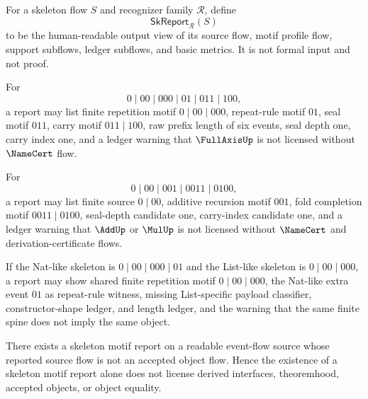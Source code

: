 \begin{definition}
\label{def:case-studies-skeleton-report}
For a skeleton flow $S$ and recognizer family $\mathcal R$, define
$$
  \mathsf{SkReport}_{\mathcal R}(S)
$$
to be the human-readable output view of its source flow, motif profile flow, support subflows, ledger subflows, and basic metrics. It is not formal input and not proof.
\end{definition}

\begin{example}
\label{ex:case-studies-completion-report}
For
$$
  0\mid 00\mid 000\mid 01\mid 011\mid 100,
$$
a report may list finite repetition motif $0\mid 00\mid 000$, repeat-rule motif $01$, seal motif $011$, carry motif $011\mid 100$, raw prefix length of six events, seal depth one, carry index one, and a ledger warning that $\FullAxisUp$ is not licensed without $\NameCert$ flow.
\end{example}

\begin{example}
\label{ex:case-studies-add-fold-report}
For
$$
  0\mid 00\mid 001\mid 0011\mid 0100,
$$
a report may list finite source $0\mid 00$, additive recursion motif $001$, fold completion motif $0011\mid 0100$, seal-depth candidate one, carry-index candidate one, and a ledger warning that $\AddUp$ or $\MulUp$ is not licensed without $\NameCert$ and derivation-certificate flows.
\end{example}

\begin{example}
\label{ex:case-studies-nat-list-report}
If the Nat-like skeleton is $0\mid 00\mid 000\mid 01$ and the List-like skeleton is $0\mid 00\mid 000$, a report may show shared finite repetition motif $0\mid 00\mid 000$, the Nat-like extra event $01$ as repeat-rule witness, missing List-specific payload classifier, constructor-shape ledger, and length ledger, and the warning that the same finite spine does not imply the same object.
\end{example}

\begin{theorem}
\label{thm:case-studies-reports-not-certificates}
There exists a skeleton motif report on a readable event-flow source whose reported source flow is not an accepted object flow. Hence the existence of a skeleton motif report alone does not license derived interfaces, theoremhood, accepted objects, or object equality.
\end{theorem}

